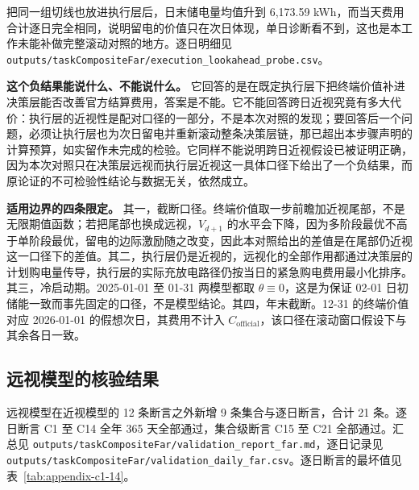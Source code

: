 \begin{appendices}
把同一组切线也放进执行层后，日末储电量均值升到 6,173.59 kWh，而当天费用合计逐日完全相同，说明留电的价值只在次日体现，单日诊断看不到，这也是本工作未能补做完整滚动对照的地方。逐日明细见 \texttt{outputs/\allowbreak taskCompositeFar/\allowbreak execution\_lookahead\_probe.csv}。

\textbf{这个负结果能说什么、不能说什么。} 它回答的是在既定执行层下把终端价值补进决策层能否改善官方结算费用，答案是不能。它不能回答跨日近视究竟有多大代价：执行层的近视性是配对口径的一部分，不是本次对照的发现；要回答后一个问题，必须让执行层也为次日留电并重新滚动整条决策层链，那已超出本步骤声明的计算预算，如实留作未完成的检验。它同样不能说明跨日近视假设已被证明正确，因为本次对照只在决策层远视而执行层近视这一具体口径下给出了一个负结果，而原论证的不可检验性结论与数据无关，依然成立。

\textbf{适用边界的四条限定。} 其一，截断口径。终端价值取一步前瞻加近视尾部，不是无限期值函数；若把尾部也换成远视，$V_{d+1}$ 的水平会下降，因为多阶段最优不高于单阶段最优，留电的边际激励随之改变，因此本对照给出的差值是在尾部仍近视这一口径下的差值。其二，执行层仍是近视的，远视化的全部作用都通过决策层的计划购电量传导，执行层的实际充放电路径仍按当日的紧急购电费用最小化排序。其三，冷启动期。2025-01-01 至 01-31 两模型都取 $\theta\equiv0$，这是为保证 02-01 日初储能一致而事先固定的口径，不是模型结论。其四，年末截断。12-31 的终端价值对应 2026-01-01 的假想次日，其费用不计入 $C_{\mathrm{official}}$，该口径在滚动窗口假设下与其余各日一致。

\subsection{远视模型的核验结果}

远视模型在近视模型的 12 条断言之外新增 9 条集合与逐日断言，合计 21 条。逐日断言 C1 至 C14 全年 365 天全部通过，集合级断言 C15 至 C21 全部通过。汇总见 \texttt{outputs/\allowbreak taskCompositeFar/\allowbreak validation\_report\_far.md}，逐日记录见 \texttt{outputs/\allowbreak taskCompositeFar/\allowbreak validation\_daily\_far.csv}。逐日断言的最坏值见表~\ref{tab:appendix-c1-14}。


\end{appendices}
